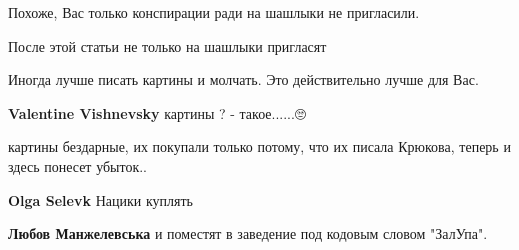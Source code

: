 \begin{itemize}
Похоже, Вас только конспирации ради на шашлыки не пригласили.

\begin{itemize}
 
После этой статьи не только на шашлыки пригласят
\end{itemize}

 
Иногда лучше писать картины и молчать. Это действительно лучше для Вас.

\begin{itemize}
 
\textbf{Valentine Vishnevsky} картины ? - такое......🙄

 
картины бездарные, их покупали только потому, что их писала Крюкова, теперь и здесь понесет убыток..

 
\textbf{Olga Selevk} Нацики куплять\Laughey[1.0][white]

 
\textbf{Любов Манжелевська} и поместят в заведение под кодовым словом "ЗалУпа".
\end{itemize}


\end{itemize}
